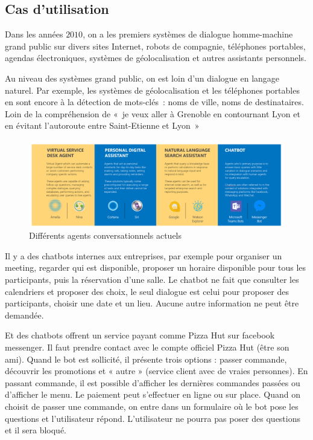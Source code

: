 \subsection{Cas d'utilisation}

Dans les années $2010$, on a les premiers systèmes de dialogue homme-machine grand public sur divers sites Internet, robots de compagnie, téléphones portables, agendas électroniques, systèmes de géolocalisation et autres assistants personnels.
\vspace{1em}

	Au niveau des systèmes grand public, on est loin  d’un dialogue en langage naturel. Par exemple, les systèmes de géolocalisation et les téléphones portables en sont encore à la détection de mots-clés : noms de ville, noms de destinataires. Loin de la compréhension de « je veux aller à Grenoble en contournant Lyon et en évitant l’autoroute entre Saint-Etienne et Lyon »
\vspace{1em}	


	\begin{figure}[H]
	\centering
		\includegraphics[width =\textwidth]{agents.png}
	\caption{Différents agents conversationnels actuels}
	\label{fig:Agents conversationnels}
\end{figure}

Il y a des chatbots internes aux entreprises, par exemple pour organiser un meeting, regarder qui est disponible, proposer un horaire disponible pour tous les participants, puis la réservation d’une salle. Le chatbot ne fait que consulter les calendriers et proposer des choix, le seul dialogue est celui pour proposer des participants, choisir une date et un lieu. Aucune autre information ne peut être demandée.
\vspace{1em}	

	Et des chatbots offrent un service payant comme Pizza Hut sur facebook messenger. Il faut prendre contact avec le compte officiel Pizza Hut (être son ami). Quand le bot est sollicité, il présente trois options : passer commande, découvrir les promotions et « autre » (service client avec de vraies personnes). En passant commande, il est possible d’afficher les dernières commandes passées ou d’afficher le menu. Le paiement peut s’effectuer en ligne ou sur place. Quand on choisit de passer une commande, on entre dans un formulaire où le bot pose les questions et l’utilisateur répond. L’utilisateur ne pourra pas poser des questions et il sera bloqué.
	\vspace{1em}	
	
